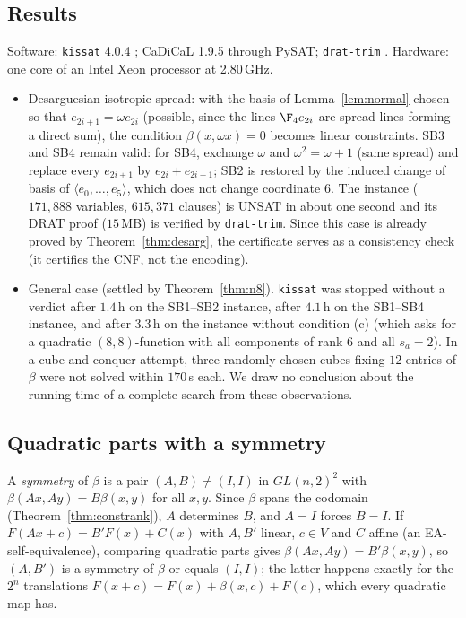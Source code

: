 \subsection{Results}
Software: \texttt{kissat} 4.0.4 \cite{Kissat}; CaDiCaL 1.9.5 through PySAT; \texttt{drat-trim}
\cite{WHH14}. Hardware: one core of an Intel Xeon processor at 2.80\,GHz.
\begin{itemize}
\item Desarguesian isotropic spread: with the basis of Lemma~\ref{lem:normal} chosen so that
$e_{2i+1}=\omega e_{2i}$ (possible, since the lines $\F_4e_{2i}$ are spread lines forming a
direct sum), the condition $\beta(x,\omega x)=0$ becomes linear constraints. SB3 and SB4 remain
valid: for SB4, exchange $\omega$ and $\omega^2=\omega+1$ (same spread) and replace every
$e_{2i+1}$ by $e_{2i}+e_{2i+1}$; SB2 is restored by the induced change of basis of
$\langle e_0,\dots,e_5\rangle$, which does not change coordinate $6$. The instance
($171{,}888$ variables, $615{,}371$ clauses) is UNSAT in about one second and its DRAT proof
($15$\,MB) is verified by \texttt{drat-trim}. Since this case is already proved by
Theorem~\ref{thm:desarg}, the certificate serves as a consistency check (it certifies the CNF,
not the encoding).
\item General case (settled by Theorem~\ref{thm:n8}). \texttt{kissat} was stopped without a verdict after $1.4$\,h on the
SB1--SB2 instance, after $4.1$\,h on the SB1--SB4 instance, and after $3.3$\,h on the instance
without condition (c) (which asks for a quadratic $(8,8)$-function with all components of rank
$6$ and all $s_a=2$). In a cube-and-conquer attempt, three randomly chosen cubes fixing $12$
entries of $\beta$ were not solved within $170$\,s each. We draw no conclusion about the
running time of a complete search from these observations.
\end{itemize}

\subsection{Quadratic parts with a symmetry}\label{sec:sym}
A \emph{symmetry} of $\beta$ is a pair $(A,B)\neq(I,I)$ in $GL(n,2)^2$ with
$\beta(Ax,Ay)=B\beta(x,y)$ for all $x,y$. Since $\beta$ spans the codomain
(Theorem~\ref{thm:constrank}), $A$ determines $B$, and $A=I$ forces $B=I$. If $F(Ax+c)=B'F(x)+C(x)$
with $A,B'$ linear, $c\in V$ and $C$ affine (an EA-self-equivalence), comparing quadratic parts
gives $\beta(Ax,Ay)=B'\beta(x,y)$, so $(A,B')$ is a symmetry of $\beta$ or equals $(I,I)$; the
latter happens exactly for the $2^n$ translations $F(x+c)=F(x)+\beta(x,c)+F(c)$, which every
quadratic map has.

